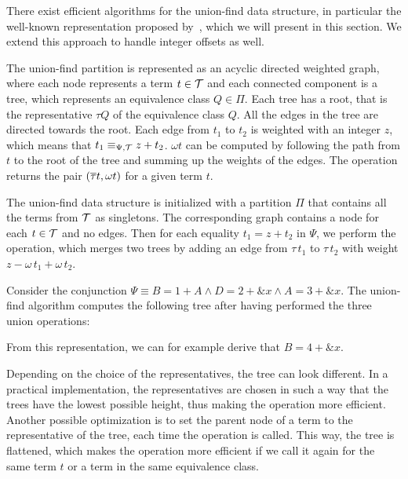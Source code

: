 There exist efficient algorithms for the union-find data structure,
in particular the well-known representation proposed by~\textcite{uf-tarjan},
which we will present in this section.
We extend this approach to handle integer offsets as well.

The union-find partition is represented as an acyclic directed weighted graph,
where each node represents a term $t \in \mathcal{T}$ and
each connected component is a tree, which represents an equivalence class $Q \in \Pi$.
Each tree has a root, that is the representative $\tau Q$ of the equivalence class $Q$.
All the edges in the tree are directed towards the root.
Each edge from $t_1$ to $t_2$ is weighted with an integer $z$,
which means that $t_1 \equiv_{\Psi,\mathcal{T}} z + t_2$.
$\omega t$ can be computed by following the path from $t$ to the root of the tree and summing up the weights of the edges.
The  operation returns the pair $(\overline{\tau} t, \omega t)$ for a given term $t$.

The union-find data structure is initialized with a partition $\Pi$ that contains all the terms from $\mathcal{T}$ as singletons.
The corresponding graph contains a node for each $t \in \mathcal{T}$ and no edges.
Then for each equality $t_1 = z + t_2$ in $\Psi$, we perform the  operation, which merges two trees by adding an edge from $\tau\,t_1$ to $\tau\,t_2$ with weight $z - \omega\,t_1 + \omega\,t_2$.

\begin{example}
Consider the conjunction $\Psi \equiv B = 1 + A \land D = 2 + \&x \land A = 3 + \&x$.
The union-find algorithm computes the following tree after having performed the three union operations:


From this representation, we can for example derive that $B = 4 + \&x$.

Depending on the choice of the representatives, the tree can look different.
In a practical implementation, the representatives are chosen in such a way that the trees have the lowest possible height,
thus making the  operation more efficient.
Another possible optimization is to set the parent node of a term to the representative of the tree,
each time the  operation is called.
This way, the tree is flattened, which makes the  operation
more efficient if we call it again for the same term $t$ or a term in the same equivalence class.
\end{example}

